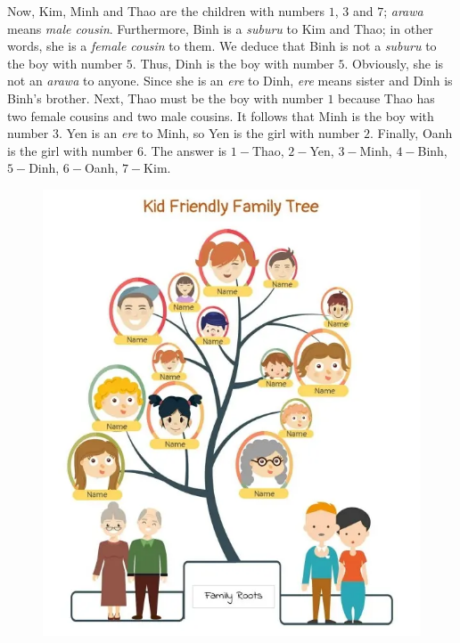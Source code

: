 \begin{multicols}{2}
	\vskip 0.1cm
	Now, Kim, Minh and Thao are the children with numbers $1$, $3$ and $7$; \emph{arawa} means \emph{male cousin}.
	Furthermore, Binh is a \textit{suburu} to Kim and Thao;
	in other words, she is a \textit{female cousin} to them.
	\vskip 0.1cm
	We deduce that Binh is not a \emph{suburu} to the boy with number $5$. Thus, Dinh is the boy with number $5$.
	Obviously, she is not an \textit{arawa} to anyone.
	Since she is an \textit{ere} to Dinh, \emph{ere} means {sister} and Dinh is Binh's brother.
	\vskip 0.1cm
	Next, Thao must be the boy with number $1$ because Thao has two female cousins and two male cousins. It follows that Minh is the boy with number $3$.
	\vskip 0.1cm
	Yen is an \emph{ere} to Minh, so Yen is the girl with number $2$. Finally, Oanh is the girl with number $6$.
	\vskip 0.1cm
	The answer is $1-$Thao, $2-$Yen, $3-$Minh, $4-$Binh, $5-$Dinh, $6-$Oanh, $7-$Kim.
	\vskip 0.25cm
\end{multicols}
\begin{figure}[H]
	\vspace*{-5pt}
	\centering
	\captionsetup{labelformat= empty, justification=centering}
	\includegraphics[width= 0.6\linewidth]{tree2}
	\vspace*{-5pt}
\end{figure}